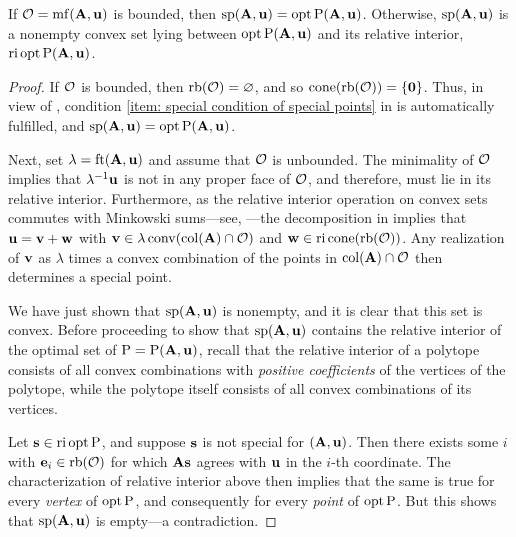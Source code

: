 \documentclass{amsart}
\begin{document}
\begin{proposition}
   \label{opt versus mc: P}
   If $\mathcal{O} = \operatorname{mf}(\mathbf{A}, \mathbf{u})$ is bounded, then $\operatorname{sp}(\mathbf{A}, \mathbf{u}) = \operatorname{opt} \mathrm{P}(\mathbf{A}, \mathbf{u})$.
   Otherwise, $\operatorname{sp}(\mathbf{A}, \mathbf{u})$ is a nonempty convex set lying between $\operatorname{opt} \mathrm{P}(\mathbf{A}, \mathbf{u})$ and its relative interior, $\operatorname{ri} \operatorname{opt} \mathrm{P}(\mathbf{A}, \mathbf{u})$.
\end{proposition}

\begin{proof}
   If $\mathcal{O}$ is bounded, then $\operatorname{rb}(\mathcal{O}) = \varnothing$, and so $\operatorname{cone}( \operatorname{rb}(\mathcal{O})) = \{\mathbf{0} \}$.
   Thus, in view of , condition \eqref{item: special condition of special points} in  is automatically fulfilled, and $\operatorname{sp}(\mathbf{A}, \mathbf{u}) = \operatorname{opt} \mathrm{P}(\mathbf{A}, \mathbf{u})$.

   Next, set $\lambda = \operatorname{ft}(\mathbf{A}, \mathbf{u})$ and assume that $\mathcal{O}$ is unbounded.
   The minimality of $\mathcal{O}$ implies that $\lambda^{-1}\mathbf{u}$ is not in any proper face of $\mathcal{O}$, and therefore, must lie in its relative interior.
   Furthermore, as the relative interior operation on convex sets commutes with Minkowski sums---see, \eg \cite[Theorem 4.10(b)]{vantiel.convex_analysis}---the decomposition in   implies that $\mathbf{u} = \mathbf{v} + \mathbf{w}$ with $\mathbf{v} \in \lambda \operatorname{conv}(\operatorname{col}(\mathbf{A}) \cap \mathcal{O})$ and $\mathbf{w} \in \operatorname{ri} \operatorname{cone}(\operatorname{rb}(\mathcal{O}))$.  Any realization of $\mathbf{v}$ as $\lambda$ times a convex combination of the points in $\operatorname{col}(\mathbf{A}) \cap \mathcal{O}$ then determines a special point.

   We have just shown that $\operatorname{sp}(\mathbf{A}, \mathbf{u})$ is nonempty, and it is clear that this set is convex.
   Before proceeding to show that $\operatorname{sp}(\mathbf{A}, \mathbf{u})$ contains the relative interior of the optimal set of $\mathrm{P} = \mathrm{P}(\mathbf{A},\mathbf{u})$, recall that the relative interior of a polytope consists of all convex combinations with \emph{positive coefficients} of the vertices of the polytope, while the polytope itself consists of all convex combinations of its vertices.

  Let $\mathbf{s} \in \operatorname{ri} \operatorname{opt} \mathrm{P}$, and suppose $\mathbf{s}$ is not special for $(\mathbf{A},\mathbf{u})$.
  Then there exists some $i$ with $\mathbf{e}_i \in \operatorname{rb}(\mathcal{O})$ for which $\mathbf{A}\mathbf{s}$ agrees with $\mathbf{u}$ in the $i$-th coordinate.
  The characterization of relative interior above then implies that the same is true for every \emph{vertex} of $\operatorname{opt} \mathrm{P}$, and consequently for every \emph{point} of $\operatorname{opt} \mathrm{P}$.
  But this shows that $\operatorname{sp}(\mathbf{A},\mathbf{u})$ is empty---a contradiction.
\end{proof}
\end{document}
